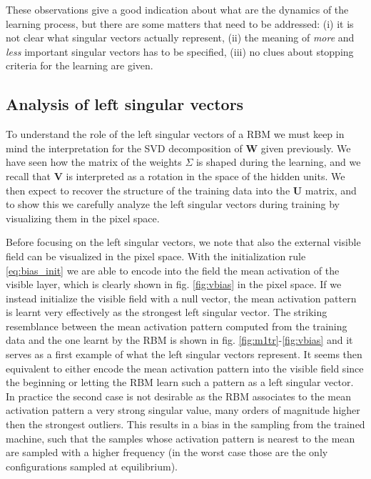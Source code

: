 \documentclass[notitlepage]{revtex4-1}
\begin{document}
These observations give a good indication about what are the dynamics of the learning process, but there are some matters that need to be addressed: (i) it is not clear what singular vectors actually represent, (ii) the meaning of \textit{more} and \textit{less} important singular vectors has to be specified, (iii) no clues about stopping criteria for the learning are given.

\subsection{Analysis of left singular vectors}

To understand the role of the left singular vectors of a RBM we must keep in mind the interpretation for the SVD decomposition of \textbf{W} given previously. We have seen how the matrix of the weights \textbf{\(\Sigma\)} is shaped during the learning, and we recall that \textbf{V} is interpreted as a rotation in the space of the hidden units. We then expect to recover the structure of the training data into the \textbf{U} matrix, and to show this we carefully analyze the left singular vectors during training by visualizing them in the pixel space.

Before focusing on the left singular vectors, we note that also the external visible field can be visualized in the pixel space. With the initialization rule \eqref{eq:bias_init} we are able to encode into the field the mean activation of the visible layer, which is clearly shown in fig. \ref{fig:vbias} in the pixel space. If we instead initialize the visible field with a null vector, the mean activation pattern is learnt very effectively as the strongest left singular vector. The striking resemblance between the mean activation pattern computed from the training data and the one learnt by the RBM is shown in fig. \ref{fig:m1tr}-\ref{fig:vbias} and it serves as a first example of what the left singular vectors represent. It seems then equivalent to either encode the mean activation pattern into the visible field since the beginning or letting the RBM learn such a pattern as a left singular vector. In practice the second case is not desirable as the RBM associates to the mean activation pattern a very strong singular value, many orders of magnitude higher then the strongest outliers. This results in a bias in the sampling from the trained machine, such that the samples whose activation pattern is nearest to the mean are sampled with a higher frequency (in the worst case those are the only configurations sampled at equilibrium).
\end{document}
